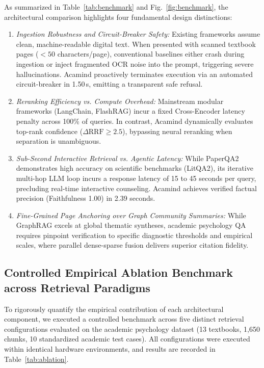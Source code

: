 \documentclass[10pt]{SPIIRAS_Proceedings}
\begin{document}
As summarized in Table~\ref{tab:benchmark} and Fig.~\ref{fig:benchmark}, the architectural comparison highlights four fundamental design distinctions:
\begin{enumerate}
    \item \textit{Ingestion Robustness and Circuit-Breaker Safety:} Existing frameworks assume clean, machine-readable digital text. When presented with scanned textbook pages ($<50$ characters/page), conventional baselines either crash during ingestion or inject fragmented OCR noise into the prompt, triggering severe hallucinations. Acamind proactively terminates execution via an automated circuit-breaker in 1.50\,s, emitting a transparent safe refusal.
    \item \textit{Reranking Efficiency vs. Compute Overhead:} Mainstream modular frameworks (LangChain, FlashRAG) incur a fixed Cross-Encoder latency penalty across 100\% of queries. In contrast, Acamind dynamically evaluates top-rank confidence ($\Delta \text{RRF} \ge 2.5$), bypassing neural reranking when separation is unambiguous.
    \item \textit{Sub-Second Interactive Retrieval vs. Agentic Latency:} While PaperQA2 \cite{skarlinski2024paperqa} demonstrates high accuracy on scientific benchmarks (LitQA2), its iterative multi-hop LLM loop incurs a response latency of 15 to 45 seconds per query, precluding real-time interactive counseling. Acamind achieves verified factual precision (Faithfulness 1.00) in 2.39 seconds.
    \item \textit{Fine-Grained Page Anchoring over Graph Community Summaries:} While GraphRAG \cite{edge2024graphrag} excels at global thematic syntheses, academic psychology QA requires pinpoint verification to specific diagnostic thresholds and empirical scales, where parallel dense-sparse fusion delivers superior citation fidelity.
\end{enumerate}

\subsection{Controlled Empirical Ablation Benchmark across Retrieval Paradigms}\label{sec:ablation}
To rigorously quantify the empirical contribution of each architectural component, we executed a controlled benchmark across five distinct retrieval configurations evaluated on the academic psychology dataset (13 textbooks, 1,650 chunks, 10 standardized academic test cases). All configurations were executed within identical hardware environments, and results are recorded in Table~\ref{tab:ablation}.
\end{document}
